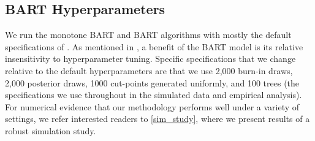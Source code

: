 \documentclass[aoas,preprint, 11pt, dvipsnames, table, x11name]{imsart}
\theoremstyle{remark}
\begin{document}
\subsection{BART Hyperparameters}
	We run the monotone BART and BART algorithms  with mostly the default specifications of \cite{bart}.  As mentioned in \cite{bart}, a benefit of the BART model is its relative insensitivity to hyperparameter tuning.  Specific specifications that we change relative to the default hyperparameters are that we use 2,000 burn-in draws, 2,000 posterior draws, 1000 cut-points generated uniformly, and 100 trees (the specifications we use throughout in the simulated data and empirical analysis). For numerical evidence that our methodology performs well under a variety of settings, we refer interested readers to \autoref{sim_study}, where we present results of a robust simulation study.
	
	\color{black}
\end{document}
